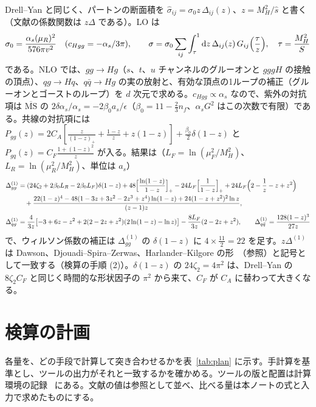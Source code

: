 \documentclass[a4paper,10pt]{ltjsarticle}
\newcommand{\dd}{\mathrm{d}}
\newcommand{\MSbar}{\overline{\mathrm{MS}}}
\begin{document}
Drell--Yan と同じく、パートンの断面積を $\hat\sigma_{ij}=\sigma_0z\,\Delta_{ij}(z)$、$z=M_H^2/\hat s$ と書く（文献の係数関数は $z\Delta$ である）。LO は
\begin{equation}
\sigma_0=\frac{\alpha_s(\mu_R)^2}{576\pi v^2}\quad(c_{Hgg}=-\alpha_s/3\pi),\qquad
\sigma=\sigma_0\sum_{ij}\int_\tau^1\dd z\,\Delta_{ij}(z)\,G_{ij}\Bigl(\frac\tau z\Bigr),\quad\tau=\frac{M_H^2}S
\label{eq:ggh0}
\end{equation}
である。NLO では、$gg\to Hg$（$s$、$t$、$u$ チャンネルのグルーオンと $gggH$ の接触の頂点）、$qg\to Hq$、$q\bar q\to Hg$ の実の放射と、有効な頂点の1ループの補正（グルーオンとゴーストのループ）を $d$ 次元で求める。$c_{Hgg}\propto\alpha_s$ なので、紫外の対抗項は $\MSbar$ の $2\delta\alpha_s/\alpha_s=-2\beta_0a_s/\epsilon$（$\beta_0=11-\frac23n_f$、$\alpha_sG^2$ はこの次数で有限）である。共線の対抗項には $P_{gg}(z)=2C_A[\frac z{(1-z)_+}+\frac{1-z}z+z(1-z)]+\frac{\beta_0}2\delta(1-z)$ と $P_{gq}(z)=C_F\frac{1+(1-z)^2}z$ が入る。結果は（$L_F=\ln(\mu_F^2/M_H^2)$、$L_R=\ln(\mu_R^2/M_H^2)$、単位は $a_s$）
\begin{align}
\Delta^{(1)}_{gg}&=(24\zeta_2+2\beta_0L_R-2\beta_0L_F)\delta(1-z)+48\Bigl[\frac{\ln(1-z)}{1-z}\Bigr]_+-24L_F\Bigl[\frac1{1-z}\Bigr]_++24L_F\Bigl(2-\frac1z-z+z^2\Bigr)\notag\\
&\quad+\frac{22(1-z)^4-48(1-3z+3z^2-2z^3+z^4)\ln(1-z)+24(1-z+z^2)^2\ln z}{(z-1)z},\label{eq:dgg}\\
\Delta^{(1)}_{qg}&=\frac4{3z}\bigl[-3+6z-z^2+2(2-2z+z^2)(2\ln(1-z)-\ln z)\bigr]-\frac{8L_F}{3z}(2-2z+z^2),\qquad
\Delta^{(1)}_{q\bar q}=\frac{128(1-z)^3}{27z}\label{eq:dqgh}
\end{align}
で、ウィルソン係数の補正は $\Delta^{(1)}_{gg}$ の $\delta(1-z)$ に $4\times\frac{11}2=22$ を足す。$z\Delta^{(1)}$ は Dawson、Djouadi--Spira--Zerwas、Harlander--Kilgore の形~\cite{dawson91,dsz91,hk02}（参照）と記号として一致する（検算の手順 (2)）。$\delta(1-z)$ の $24\zeta_2=4\pi^2$ は、Drell--Yan の $8\zeta_2C_F$ と同じく時間的な形状因子の $\pi^2$ から来て、$C_F$ が $C_A$ に替わって大きくなる。

\section{検算の計画}\label{sec:plan}

各量を、どの手段で計算して突き合わせるかを表~\ref{tab:plan} に示す。手計算を基準とし、ツールの出力がそれと一致するかを確かめる。ツールの版と配置は計算環境の記録~\cite{env} にある。文献の値は参照として並べ、比べる量は本ノートの式と入力で求めたものにする。
\end{document}
